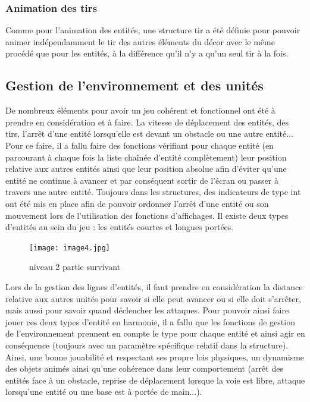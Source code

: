 \documentclass[a4paper,11pt]{article}
\begin{document}
\subsubsection{Animation des tirs}
Comme pour l'animation des entités, une structure tir a été définie pour pouvoir animer indépendamment le tir des autres éléments du décor avec le même procédé que pour les entités, à la différence qu'il n'y a qu'un seul tir à la fois.

\subsection{Gestion de l'environnement et des unités}

De nombreux éléments pour avoir un jeu cohérent et fonctionnel ont été à prendre en considération et à faire. La vitesse de déplacement des entités, des tirs, l'arrêt d'une entité lorsqu'elle est devant un obstacle ou une autre entité... Pour ce faire, il a fallu faire des fonctions vérifiant pour chaque entité (en parcourant à chaque fois la liste chaînée d'entité complètement) leur position relative aux autres entités ainsi que leur position absolue afin d'éviter qu'une entité ne continue à avancer et par conséquent sortir de l'écran ou passer à travers une autre entité. Toujours dans les structures, des indicateurs de type int ont été mis en place afin de pouvoir ordonner l'arrêt d'une entité ou son mouvement lors de l'utilisation des fonctions d'affichages. Il existe deux types d'entités au sein du jeu : les entités courtes et longues portées.

\begin{figure}[ht!]
\centering
\texttt{[image: image4.jpg]} 
\caption {\label{image7} niveau 2 partie survivant}
\end{figure}
 \smallbreak
Lors de la gestion des lignes d'entités, il faut prendre en considération la distance relative aux autres unités pour savoir si elle peut avancer ou si elle doit s'arrêter, mais aussi pour savoir quand déclencher les attaques. Pour pouvoir ainsi faire jouer ces deux types d'entité en harmonie, il a fallu que les fonctions de gestion de l'environnement prennent en compte le type pour chaque entité et ainsi agir en conséquence (toujours avec un paramètre spécifique relatif dans la structure). Ainsi, une bonne jouabilité et respectant ses propre lois physiques, un dynamisme des objets animés ainsi qu'une cohérence dans leur comportement (arrêt des entités face à un obstacle, reprise de déplacement lorsque la voie est libre, attaque lorsqu'une entité ou une base est à portée de main...).
\end{document}
